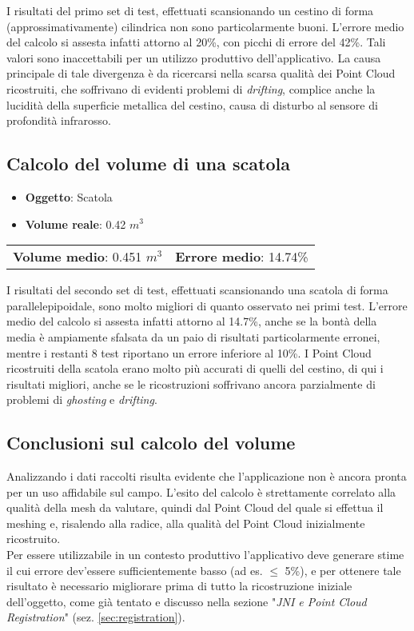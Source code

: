 \noindent
I risultati del primo set di test, effettuati scansionando un cestino di forma (approssimativamente) cilindrica non sono particolarmente buoni. L'errore medio del calcolo si assesta infatti attorno al 20\%, con picchi di errore del 42\%. Tali valori sono inaccettabili per un utilizzo produttivo dell'applicativo. La causa principale di tale divergenza è da ricercarsi nella scarsa qualità dei Point Cloud ricostruiti, che soffrivano di evidenti problemi di \emph{drifting}, complice anche la lucidità della superficie metallica del cestino, causa di disturbo al sensore di profondità infrarosso.

\subsection{Calcolo del volume di una scatola}
\begin{itemize}
\item \textbf{Oggetto}: Scatola 
\item \textbf{Volume reale}: 0.42 $ m^3 $
\end{itemize}
\noindent
\begin{tabular}{l r}
\textbf{Volume medio}: 0.451 $m^3$ & \hspace{115pt} \textbf{Errore medio}: 14.74\% \\
\end{tabular}
\newline

\noindent
I risultati del secondo set di test, effettuati scansionando una scatola di forma parallelepipoidale, sono molto migliori di quanto osservato nei primi test.
L'errore medio del calcolo si assesta infatti attorno al 14.7\%, anche se la bontà della media è ampiamente sfalsata da un paio di risultati particolarmente erronei, mentre i restanti 8 test riportano un errore inferiore al 10\%.
I Point Cloud ricostruiti della scatola erano molto più accurati di quelli del cestino, di qui i risultati migliori, anche se le ricostruzioni soffrivano ancora parzialmente di problemi di \emph{ghosting} e \emph{drifting}.

\subsection{Conclusioni sul calcolo del volume}
Analizzando i dati raccolti risulta evidente che l'applicazione non è ancora pronta per un uso affidabile sul campo. L'esito del calcolo è strettamente correlato alla qualità della mesh da valutare, quindi dal Point Cloud del quale si effettua il meshing e, risalendo alla radice, alla qualità del Point Cloud inizialmente ricostruito.\\
Per essere utilizzabile in un contesto produttivo l'applicativo deve generare stime il cui errore dev'essere sufficientemente basso (ad es. $\leq$ 5\%), e per ottenere tale risultato è necessario migliorare prima di tutto la ricostruzione iniziale dell'oggetto, come già tentato e discusso nella sezione "\emph{JNI e Point Cloud Registration}" (sez. \ref{sec:registration}).


